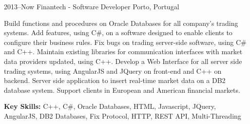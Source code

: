 \documentclass[]{friggeri-cv} %
\begin{document}
\begin{entrylist}


\entry
{2013--Now}
{Finantech - Software Developer}
{Porto, Portugal}
{
Build functions and procedures on Oracle Databases for all company's trading systems. Add features, using C\#, on a software designed to enable clients to configure their business rules. Fix bugs on trading server-side software, using C\# and C++. Maintain existing libraries for communication interfaces with market data providers updated, using C++. Develop a Web Interface for all server side trading systems, using AngularJS and JQuery on front-end and C++ on backend. Server side application to insert real-time market data on a DB2 database system. Support clients in European and American financial markets. 

\textbf{Key Skills: }
C++, C\#, Oracle Databases, HTML, Javascript, JQuery, AngularJS, DB2 Databases, Fix Protocol, HTTP, REST API, Multi-Threading

%
}



\end{entrylist}
\end{document}
